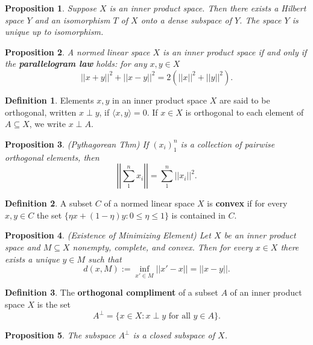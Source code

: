 \documentclass[11pt]{amsart}
\newtheorem*{proposition*}{Proposition}
\theoremstyle{definition}
\newtheorem*{definition*}{Definition}
\renewcommand\leq{\leqslant}
\renewcommand\:{\colon}
\begin{document}
\begin{proposition*}
	Suppose $X$ is an inner product space. Then there exists a Hilbert space $Y$ and an isomorphism $T$ of $X$ onto a dense subspace of $Y$. The space $Y$ is unique up to isomorphism.
\end{proposition*}

\begin{proposition*}
	A normed linear space $X$ is an inner product space if and only if the \textbf{parallelogram law} holds: for any $x, y \in X$
			\[ ||x + y||^2 + ||x - y||^2 = 2(||x||^2 + ||y||^2). \]
\end{proposition*}

\begin{definition*}
	Elements $x, y$ in an inner product space $X$ are said to be orthogonal, written $x \perp y$, if $\langle x,y \rangle = 0$. If $x \in X$ is orthogonal to each element of $A \subseteq X$, we write $x \perp A$.
\end{definition*}

\begin{proposition*}
	\textnormal{(Pythagorean Thm)} If $(x_i)_1^n$ is a collection of pairwise orthogonal elements, then
		\[ \left|\left| \sum_ 1^n x_i \right|\right| = \sum_1^n ||x_i||^2. \]
\end{proposition*}

\begin{definition*}
	A subset $C$ of a normed linear space $X$ is \textbf{convex} if for every $x, y \in C$ the set $\{ \eta x + (1 - \eta)y : 0 \leq \eta \leq 1 \}$ is contained in $C$.
\end{definition*}

\begin{proposition*}
	\textnormal{(Existence of Minimizing Element)} Let $X$ be an inner product space and $M \subseteq X$ nonempty, complete, and convex. Then for every $x \in X$ there exists a unique $y \in M$ such that 
		\[ d(x, M) := \inf_{x' \in M} ||x' - x|| = ||x - y||. \]
\end{proposition*}

\begin{definition*}
	The \textbf{orthogonal compliment} of a subset $A$ of an inner product space $X$ is the set 
		\[ A^\perp = \{ x \in X : x \perp y \text{ for all } y \in A \}. \]
\end{definition*}

\begin{proposition*}
	 The subspace $A^\perp$ is a closed subspace of $X$.
\end{proposition*}
\end{document}
